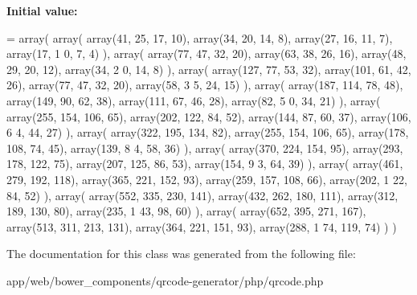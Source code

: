 {\bfseries Initial value\+:}
\begin{DoxyCode}
= array(
        array( array(41,  25,  17,  10),  array(34,  20,  14,  8),   array(27,  16,  11,  7),  array(17,  1
      0,  7,   4) ),
        array( array(77,  47,  32,  20),  array(63,  38,  26,  16),  array(48,  29,  20,  12), array(34,  2
      0,  14,  8) ),
        array( array(127, 77,  53,  32),  array(101, 61,  42,  26),  array(77,  47,  32,  20), array(58,  3
      5,  24,  15) ),
        array( array(187, 114, 78,  48),  array(149, 90,  62,  38),  array(111, 67,  46,  28), array(82,  5
      0,  34,  21) ),
        array( array(255, 154, 106, 65),  array(202, 122, 84,  52),  array(144, 87,  60,  37), array(106, 6
      4,  44,  27) ),
        array( array(322, 195, 134, 82),  array(255, 154, 106, 65),  array(178, 108, 74,  45), array(139, 8
      4,  58,  36) ),
        array( array(370, 224, 154, 95),  array(293, 178, 122, 75),  array(207, 125, 86,  53), array(154, 9
      3,  64,  39) ),
        array( array(461, 279, 192, 118), array(365, 221, 152, 93),  array(259, 157, 108, 66), array(202, 1
      22, 84,  52) ),
        array( array(552, 335, 230, 141), array(432, 262, 180, 111), array(312, 189, 130, 80), array(235, 1
      43, 98,  60) ),
        array( array(652, 395, 271, 167), array(513, 311, 213, 131), array(364, 221, 151, 93), array(288, 1
      74, 119, 74) )
    )
\end{DoxyCode}


The documentation for this class was generated from the following file\+:\begin{DoxyCompactItemize}
\item 
app/web/bower\+\_\+components/qrcode-\/generator/php/qrcode.\+php\end{DoxyCompactItemize}
